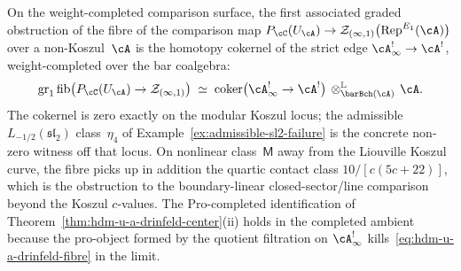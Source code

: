 \begin{remark}
\label{rem:hdm-u-a-drinfeld-center-fibre}
On the weight-completed comparison surface, the first associated
graded obstruction of the fibre of the comparison map
$P_\cC(U_\cA) \to
\mathcal Z_{(\infty,1)}\bigl(\mathrm{Rep}^{E_1}(\cA)\bigr)$
over a non-Koszul~$\cA$ is the homotopy cokernel of the strict edge
$\cA^{!}_\infty \to \cA^!$, weight-completed over the bar coalgebra:
\begin{equation}\label{eq:hdm-u-a-drinfeld-fibre}
\operatorname{gr}_1\mathrm{fib}\bigl(P_\cC(U_\cA) \to
\mathcal Z_{(\infty,1)}\bigr)
\;\simeq\;
\mathrm{coker}\bigl(\cA^{!}_\infty \to \cA^!\bigr)
\,\otimes^{\mathbb L}_{\barBch(\cA)}\, \cA.
\end{equation}
The cokernel is zero exactly on the modular Koszul locus; the
admissible $L_{-1/2}(\mathfrak{sl}_2)$ class~$\eta_4$ of
Example~\ref{ex:admissible-sl2-failure} is the concrete non-zero
witness off that locus. On nonlinear class~$\mathsf{M}$ away from
the Liouville Koszul curve, the fibre picks up in addition the
quartic contact class $10/[c(5c+22)]$, which is the obstruction to
the boundary-linear closed-sector/line comparison beyond the Koszul
$c$-values. The $\mathrm{Pro}$-completed identification of
Theorem~\ref{thm:hdm-u-a-drinfeld-center}\textup{(ii)} holds in the
completed ambient because the pro-object formed by the quotient filtration on
$\cA^!_\infty$ kills~\eqref{eq:hdm-u-a-drinfeld-fibre} in the limit.
\end{remark}

